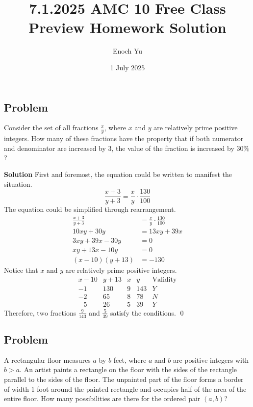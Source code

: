 \documentclass{article}
\title{7.1.2025 AMC 10 Free Class Preview Homework Solution}
\author{Enoch Yu}
\date{1 July 2025}
\newenvironment{solution}{\begin{trivlist}\item[]{\bf Solution}}{\qed \end{trivlist}}
\begin{document}
\maketitle

\subsection*{Problem}
Consider the set of all fractions $\frac{x}{y}$,
where $x$ and $y$ are relatively prime positive integers.
How many of these fractions have the property that if
both numerator and denominator are increased by $3$,
the value of the fraction is increased by $30\%$?

\begin{solution}
First and foremost, the equation could be written
to manifest the situation.
\[
\frac{x + 3}{y + 3}
= \frac{x}{y} \cdot \frac{130}{100}
\]
The equation could be simplified through rearrangement.
\begin{align*}
    \frac{x + 3}{y + 3} &= \frac{x}{y} \cdot \frac{130}{100} \\
    10xy + 30y &= 13xy + 39x \\
    3xy + 39x - 30y &= 0 \\
    xy + 13x - 10y &= 0 \\
    (x - 10)(y + 13) &= -130
\end{align*}
Notice that $x$ and $y$ are relatively prime positive integers.
\[
\begin{array}{cc|cc|c}
    x - 10 & y + 13 & x & y & \text{Validity} \\
    \hline
    -1 & 130 & 9 & 143 & Y \\
    -2 & 65 & 8 & 78 & N \\
    -5 & 26 & 5 & 39 & Y
\end{array}
\]
Therefore, $\boxed{\text{two}}$ fractions $\frac{9}{143}$
and $\frac{5}{39}$ satisfy the conditions.
\end{solution}

\subsection*{Problem}
A rectangular floor measures $a$ by $b$ feet,
where $a$ and $b$ are positive integers with $b > a$.
An artist paints a rectangle on the floor with the
sides of the rectangle parallel to the sides of the floor.
The unpainted part of the floor forms a border of width
$1$ foot around the painted rectangle and occupies half
of the area of the entire floor. How many possibilities
are there for the ordered pair $(a, b)$?
\end{document}
